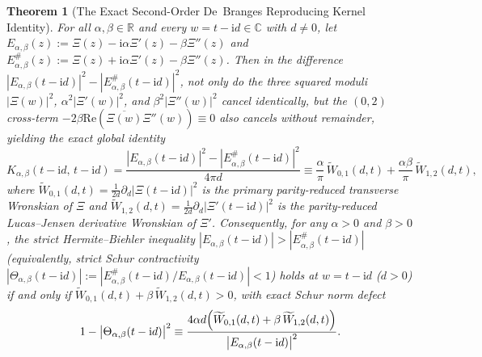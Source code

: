 \documentclass[11pt,reqno]{amsart}
\newtheorem{theorem}{Theorem}[section]
\theoremstyle{definition}
\theoremstyle{remark}
\numberwithin{equation}{section}
\newcommand{\R}{\mathbb{R}}
\newcommand{\C}{\mathbb{C}}
\newcommand{\ii}{\mathrm{i}}
\newcommand{\Rea}{\mathrm{Re}}
\begin{document}
\begin{theorem}[The Exact Second-Order De~Branges Reproducing Kernel Identity]\label{thm:second_order_kernel}
For all $\alpha, \beta \in \R$ and every $w = t - \ii d \in \C$ with $d \neq 0$, let $E_{\alpha,\beta}(z) := \Xi(z) - \ii\alpha\Xi'(z) - \beta\Xi''(z)$ and $E_{\alpha,\beta}^\#(z) := \Xi(z) + \ii\alpha\Xi'(z) - \beta\Xi''(z)$. Then in the difference $|E_{\alpha,\beta}(t-\ii d)|^2 - |E_{\alpha,\beta}^\#(t-\ii d)|^2$, not only do the three squared moduli $|\Xi(w)|^2$, $\alpha^2|\Xi'(w)|^2$, and $\beta^2|\Xi''(w)|^2$ cancel identically, but the $(0,2)$ cross-term $-2\beta\Rea(\overline{\Xi(w)}\Xi''(w)) \equiv 0$ also cancels without remainder, yielding the exact global identity
\begin{equation}\label{eq:boxed_second_order_kernel}
\boxed{K_{\alpha,\beta}(t - \ii d,\, t - \ii d) = \frac{|E_{\alpha,\beta}(t - \ii d)|^2 - |E_{\alpha,\beta}^\#(t - \ii d)|^2}{4\pi d} \equiv \frac{\alpha}{\pi}\,\widetilde{W}_{0,1}(d,t) + \frac{\alpha\beta}{\pi}\,\widetilde{W}_{1,2}(d,t),}
\end{equation}
where $\widetilde{W}_{0,1}(d,t) = \frac{1}{2d}\partial_d|\Xi(t-\ii d)|^2$ is the primary parity-reduced transverse Wronskian of $\Xi$ and $\widetilde{W}_{1,2}(d,t) = \frac{1}{2d}\partial_d|\Xi'(t-\ii d)|^2$ is the parity-reduced Lucas--Jensen derivative Wronskian of $\Xi'$. Consequently, for any $\alpha > 0$ and $\beta > 0$, the strict Hermite--Biehler inequality $|E_{\alpha,\beta}(t-\ii d)| > |E_{\alpha,\beta}^\#(t-\ii d)|$ (equivalently, strict Schur contractivity $|\Theta_{\alpha,\beta}(t-\ii d)| := |E_{\alpha,\beta}^\#(t-\ii d)/E_{\alpha,\beta}(t-\ii d)| < 1$) holds at $w = t - \ii d$ ($d > 0$) if and only if $\widetilde{W}_{0,1}(d,t) + \beta\,\widetilde{W}_{1,2}(d,t) > 0$, with exact Schur norm defect
\begin{equation}\label{eq:schur_defect_second_order}
1 - \bigl|\Theta_{\alpha,\beta}(t - \ii d)\bigr|^2 \equiv \frac{4\alpha d\Bigl(\widetilde{W}_{0,1}(d,t) + \beta\,\widetilde{W}_{1,2}(d,t)\Bigr)}{\bigl|E_{\alpha,\beta}(t - \ii d)\bigr|^2}.
\end{equation}
\end{theorem}
\end{document}
